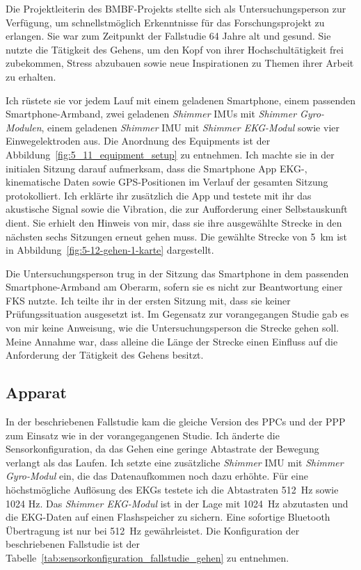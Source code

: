 Die Projektleiterin des \acs{BMBF}-Projekts stellte sich als Untersuchungsperson zur Verfügung, um schnellstmöglich Erkenntnisse für das Forschungsprojekt zu erlangen. Sie war zum Zeitpunkt der Fallstudie 64 Jahre alt und gesund. Sie nutzte die Tätigkeit des Gehens, um den Kopf von ihrer Hochschultätigkeit frei zubekommen, Stress abzubauen sowie neue Inspirationen zu Themen ihrer Arbeit zu erhalten.

Ich rüstete sie vor jedem Lauf mit einem geladenen Smartphone, einem passenden Smartphone-Armband, zwei geladenen \emph{Shimmer} \acp{IMU} mit \emph{Shimmer Gyro-Modulen}, einem geladenen \emph{Shimmer} \ac{IMU} mit \emph{Shimmer EKG-Modul} sowie vier Einwegelektroden aus. Die Anordnung des Equipments ist der Abbildung~\ref{fig:5_11_equipment_setup} zu entnehmen. Ich machte sie in der initialen Sitzung darauf aufmerksam, dass die Smartphone App \ac{EKG}-, kinematische Daten sowie \ac{GPS}-Positionen im Verlauf der gesamten Sitzung protokolliert. Ich erklärte ihr zusätzlich die App und testete mit ihr das akustische Signal sowie die Vibration, die zur Aufforderung einer Selbstauskunft dient. Sie erhielt den Hinweis von mir, dass sie ihre ausgewählte Strecke in den nächsten sechs Sitzungen erneut gehen muss. Die gewählte Strecke von 5~km ist in Abbildung~\ref{fig:5-12-gehen-1-karte} dargestellt.

Die Untersuchungsperson trug in der Sitzung das Smartphone in dem passenden Smartphone-Armband am Oberarm, sofern sie es nicht zur Beantwortung einer \ac{FKS} nutzte. Ich teilte ihr in der ersten Sitzung mit, dass sie keiner Prüfungssituation ausgesetzt ist. Im Gegensatz zur vorangegangen Studie gab es von mir keine Anweisung, wie die Untersuchungsperson die Strecke gehen soll. Meine Annahme war, dass alleine die Länge der Strecke einen Einfluss auf die Anforderung der Tätigkeit des Gehens besitzt.

\subsection{Apparat}
In der beschriebenen Fallstudie kam die gleiche Version des \ac{PPC}s und der \ac{PPP} zum Einsatz wie in der vorangegangenen Studie. Ich änderte die Sensorkonfiguration, da das Gehen eine geringe Abtastrate der Bewegung verlangt als das Laufen. Ich setzte eine zusätzliche \emph{Shimmer} \ac{IMU} mit \emph{Shimmer Gyro-Modul} ein, die das Datenaufkommen noch dazu erhöhte. Für eine höchstmögliche Auflösung des \ac{EKG}s testete ich die Abtastraten 512~Hz sowie 1024 Hz. Das \emph{Shimmer EKG-Modul} ist in der Lage mit 1024~Hz abzutasten und die \ac{EKG}-Daten auf einen Flashspeicher zu sichern. Eine sofortige Bluetooth Übertragung ist nur bei 512~Hz gewährleistet. Die Konfiguration der beschriebenen Fallstudie ist der Tabelle~\ref{tab:sensorkonfiguration_fallstudie_gehen} zu entnehmen.

